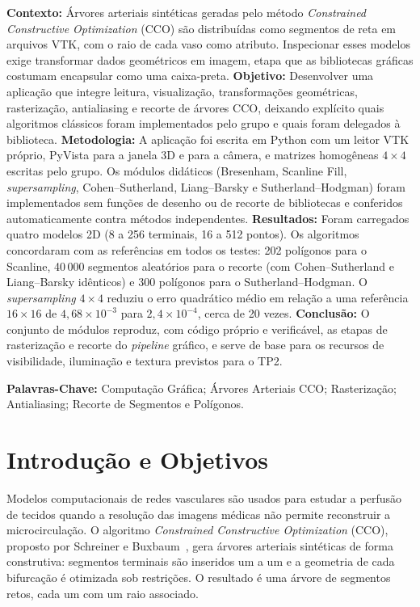 \documentclass[11pt, a4paper]{article}
\begin{document}
\begin{tcolorbox}[colback=lightgray, colframe=deepnavy, arc=3pt, title=\textbf{RESUMO}, fonttitle=\bfseries]
\small
\textbf{Contexto:} Árvores arteriais sintéticas geradas pelo método \emph{Constrained Constructive Optimization} (CCO) são distribuídas como segmentos de reta em arquivos VTK, com o raio de cada vaso como atributo. Inspecionar esses modelos exige transformar dados geométricos em imagem, etapa que as bibliotecas gráficas costumam encapsular como uma caixa-preta.
\textbf{Objetivo:} Desenvolver uma aplicação que integre leitura, visualização, transformações geométricas, rasterização, antialiasing e recorte de árvores CCO, deixando explícito quais algoritmos clássicos foram implementados pelo grupo e quais foram delegados à biblioteca.
\textbf{Metodologia:} A aplicação foi escrita em Python com um leitor VTK próprio, PyVista para a janela 3D e para a câmera, e matrizes homogêneas $4\times4$ escritas pelo grupo. Os módulos didáticos (Bresenham, Scanline Fill, \emph{supersampling}, Cohen--Sutherland, Liang--Barsky e Sutherland--Hodgman) foram implementados sem funções de desenho ou de recorte de bibliotecas e conferidos automaticamente contra métodos independentes.
\textbf{Resultados:} Foram carregados quatro modelos 2D (8 a 256 terminais, 16 a 512 pontos). Os algoritmos concordaram com as referências em todos os testes: 202 polígonos para o Scanline, 40\,000 segmentos aleatórios para o recorte (com Cohen--Sutherland e Liang--Barsky idênticos) e 300 polígonos para o Sutherland--Hodgman. O \emph{supersampling} $4\times4$ reduziu o erro quadrático médio em relação a uma referência $16\times16$ de $4{,}68\times10^{-3}$ para $2{,}4\times10^{-4}$, cerca de 20 vezes.
\textbf{Conclusão:} O conjunto de módulos reproduz, com código próprio e verificável, as etapas de rasterização e recorte do \emph{pipeline} gráfico, e serve de base para os recursos de visibilidade, iluminação e textura previstos para o TP2.

\vspace{0.2cm}
\textbf{Palavras-Chave:} Computação Gráfica; Árvores Arteriais CCO; Rasterização; Antialiasing; Recorte de Segmentos e Polígonos.
\end{tcolorbox}

\vspace{0.4cm}

\section{Introdução e Objetivos}
Modelos computacionais de redes vasculares são usados para estudar a perfusão de tecidos quando a resolução das imagens médicas não permite reconstruir a microcirculação. O algoritmo \emph{Constrained Constructive Optimization} (CCO), proposto por Schreiner e Buxbaum~\cite{schreiner1993}, gera árvores arteriais sintéticas de forma construtiva: segmentos terminais são inseridos um a um e a geometria de cada bifurcação é otimizada sob restrições. O resultado é uma árvore de segmentos retos, cada um com um raio associado.
\end{document}
